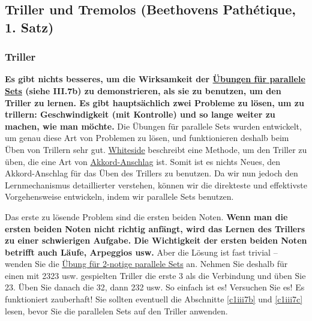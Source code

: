 
\subsection{Triller und Tremolos (Beethovens Pathétique, 1. Satz)}
\label{c1iii3}

\subsubsection{Triller}

\textbf{Es gibt nichts besseres, um die Wirksamkeit der \hyperref[c1iii7b]{Übungen für parallele Sets} (siehe III.7b) zu demonstrieren, als sie zu benutzen, um den Triller zu lernen.
Es gibt hauptsächlich zwei Probleme zu lösen, um zu trillern: Geschwindigkeit (mit Kontrolle) und so lange weiter zu machen, wie man möchte.}
Die Übungen für parallele Sets wurden entwickelt, um genau diese Art von Problemen zu lösen, und funktionieren deshalb beim Üben von Trillern sehr gut.
\hyperref[Whiteside]{Whiteside} beschreibt eine Methode, um den Triller zu üben, die eine Art von \hyperref[c1ii9]{Akkord-Anschlag} ist.
Somit ist es nichts Neues, den Akkord-Anschlag für das Üben des Trillers zu benutzen.
Da wir nun jedoch den Lernmechanismus detaillierter verstehen, können wir die direkteste und effektivste Vorgehensweise entwickeln, indem wir parallele Sets benutzen.

Das erste zu lösende Problem sind die ersten beiden Noten.
\textbf{Wenn man die ersten beiden Noten nicht richtig anfängt, wird das Lernen des Trillers zu einer schwierigen Aufgabe.
Die Wichtigkeit der ersten beiden Noten betrifft auch Läufe, Arpeggios usw.}
Aber die Lösung ist fast trivial -- wenden Sie die \hyperref[c1iii7b2]{Übung für 2-notige parallele Sets} an.
Nehmen Sie deshalb für einen mit 2323 usw. gespielten Triller die erste 3 als die Verbindung und üben Sie 23.
Üben Sie danach die 32, dann 232 usw.
So einfach ist es! Versuchen Sie es! Es funktioniert zauberhaft!
Sie sollten eventuell die Abschnitte \hyperref[c1iii7b]{\autoref{c1iii7b}} und \hyperref[c1iii7c]{\autoref{c1iii7c}} lesen, bevor Sie die parallelen Sets auf den Triller anwenden.

